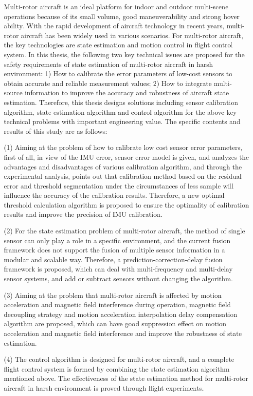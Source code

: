 \documentclass[
  type=master
]{gdutthesis}
\begin{document}
\begin{abstract*}
  Multi-rotor aircraft is an ideal platform for indoor and outdoor multi-scene operations because of its small volume, good maneuverability and strong hover ability.
  With the rapid development of aircraft technology in recent years, multi-rotor aircraft has been widely used in various scenarios.
  For multi-rotor aircraft, the key technologies are state estimation and motion control in flight control system.
  In this thesis, the following two key technical issues are proposed for the safety requirements of state estimation of multi-rotor aircraft in harsh environment:
  1) How to calibrate the error parameters of low-cost sensors to obtain accurate and reliable measurement values;
  2) How to integrate multi-source information to improve the accuracy and robustness of aircraft state estimation.
  Therefore, this thesis designs solutions including sensor calibration algorithm, state estimation algorithm and control algorithm for the above key technical problems with important engineering value.
  The specific contents and results of this study are as follows:
  
  (1) Aiming at the problem of how to calibrate low cost sensor error parameters, first of all, in view of the IMU error, sensor error model is given, and analyzes the advantages and disadvantages of various calibration algorithm, and through the experimental analysis, points out that calibration method based on the residual error and threshold segmentation under the circumstances of less sample will influence the accuracy of the calibration results.
  Therefore, a new optimal threshold calculation algorithm is proposed to ensure the optimality of calibration results and improve the precision of IMU calibration.
  
  (2) For the state estimation problem of multi-rotor aircraft, the method of single sensor can only play a role in a specific environment, and the current fusion framework does not support the fusion of multiple sensor information in a modular and scalable way.
  Therefore, a prediction-correction-delay fusion framework is proposed, which can deal with multi-frequency and multi-delay sensor systems, and add or subtract sensors without changing the algorithm.
  
  (3) Aiming at the problem that multi-rotor aircraft is affected by motion acceleration and magnetic field interference during operation, magnetic field decoupling strategy and motion acceleration interpolation delay compensation algorithm are proposed, which can have good suppression effect on motion acceleration and magnetic field interference and improve the robustness of state estimation.
  
  (4) The control algorithm is designed for multi-rotor aircraft, and a complete flight control system is formed by combining the state estimation algorithm mentioned above. The effectiveness of the state estimation method for multi-rotor aircraft in harsh environment is proved through flight experiments.  
\end{abstract*}
\end{document}
